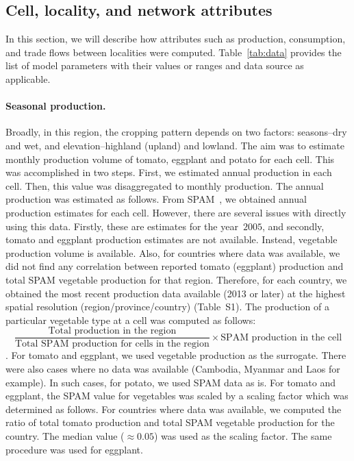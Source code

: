 \documentclass[11pt]{article}
\theoremstyle{definition}
\begin{document}
\subsection{Cell, locality, and network attributes}
In this section, we will describe how attributes such as production,
consumption, and trade flows between localities were computed.
Table~\ref{tab:data} provides the list of model parameters with their
values or ranges and data source as applicable.

\paragraph{Seasonal production.}
Broadly, in this region, the cropping pattern depends on two factors:
seasons--dry and wet, and elevation--highland (upland) and lowland. 
The aim was to estimate monthly production volume of tomato, eggplant and
potato for each cell. This was accomplished in two steps. First,
we estimated annual production in each cell. Then, this value was
disaggregated to monthly production. The annual production was estimated as
follows. From SPAM~\cite{spam}, we obtained annual production
estimates for each cell. However,
there are several issues with directly using this data. Firstly, these are estimates
for the year~$2005$, and secondly, tomato and eggplant production estimates
are not available. Instead, vegetable production volume is
available. Also, for countries where data was available, we did not find any correlation between reported tomato
(eggplant) production and total SPAM vegetable production for that region. Therefore, for each country, we obtained the most recent
production data available (2013 or later) at the highest spatial
resolution (region/province/country) (Table~S1). The production of a particular
vegetable type at a cell was computed
as follows: 
\[\frac{\text{Total production in the region}}{\text{Total SPAM production
    for cells in the region}}\times \text{SPAM production in the cell}\].
For tomato and eggplant, we used vegetable production as the surrogate.
There were also cases where no data was available (Cambodia, Myanmar and
Laos for example). In such cases, for potato, we used SPAM data as is. For
tomato and eggplant, the SPAM value for vegetables was scaled by a scaling
factor which was determined as follows. For countries where data was
available, we computed the ratio of total tomato production and total SPAM
vegetable production for the country. The median value ($\approx0.05$) was
used as the scaling factor. The same procedure was used for eggplant. 
\end{document}
